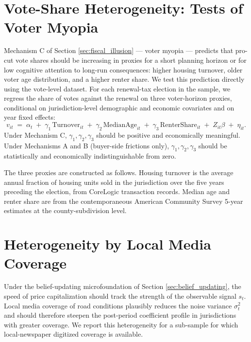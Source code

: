 \section{Vote-Share Heterogeneity: Tests of Voter Myopia} \label{sec:vote_share_heterogeneity}

Mechanism C of Section \ref{sec:fiscal_illusion} --- voter myopia --- predicts that pro-cut vote shares should be increasing in proxies for a short planning horizon or for low cognitive attention to long-run consequences: higher housing turnover, older voter age distribution, and a higher renter share. We test this prediction directly using the vote-level dataset. For each renewal-tax election in the sample, we regress the share of votes against the renewal on three voter-horizon proxies, conditional on jurisdiction-level demographic and economic covariates and on year fixed effects:
\begin{equation}
v_{it} \;=\; \alpha_t \;+\; \gamma_1 \,\mathrm{Turnover}_{it} \;+\; \gamma_2 \,\mathrm{MedianAge}_{it} \;+\; \gamma_3 \,\mathrm{RenterShare}_{it} \;+\; Z_{it}\beta \;+\; \eta_{it}.
\label{eq:voter_horizon_regression}
\end{equation}
Under Mechanism C, $\gamma_1, \gamma_2, \gamma_3$ should be positive and economically meaningful. Under Mechanisms A and B (buyer-side frictions only), $\gamma_1, \gamma_2, \gamma_3$ should be statistically and economically indistinguishable from zero.

The three proxies are constructed as follows. Housing turnover is the average annual fraction of housing units sold in the jurisdiction over the five years preceding the election, from CoreLogic transaction records. Median age and renter share are from the contemporaneous American Community Survey 5-year estimates at the county-subdivision level.


\section{Heterogeneity by Local Media Coverage}

Under the belief-updating microfoundation of Section \ref{sec:belief_updating}, the speed of price capitalization should track the strength of the observable signal $s_t$. Local media coverage of road conditions plausibly reduces the noise variance $\sigma_t^2$ and should therefore steepen the post-period coefficient profile in jurisdictions with greater coverage. We report this heterogeneity for a sub-sample for which local-newspaper digitized coverage is available.

